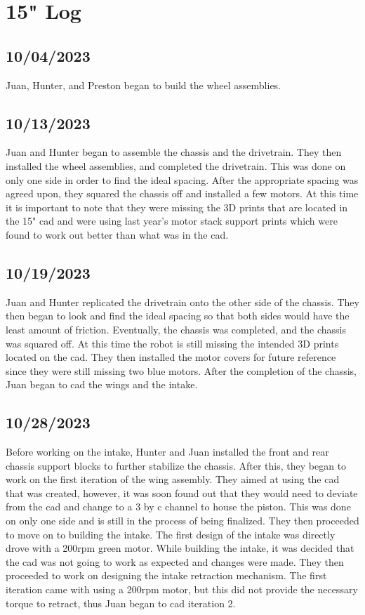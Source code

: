 \section{15" Log}
\subsection{10/04/2023}
Juan, Hunter, and Preston began to build the wheel assemblies.

\subsection{10/13/2023}
Juan and Hunter began to assemble the chassis and the drivetrain. They then installed
the wheel assemblies, and completed the drivetrain. This was done on only one side
in order to find the ideal spacing. After the appropriate spacing was agreed upon,
they squared the chassis off and installed a few motors. At this time it is important to note that they
were missing the 3D prints that are located in the 15" cad and were using last year's motor stack
support prints which were found to work out better than what was in the cad.

\subsection{10/19/2023}
Juan and Hunter replicated the drivetrain onto the other side of the chassis. They then began to
look and find the ideal spacing so that both sides would have the least amount of friction. Eventually,
the chassis was completed, and the chassis was squared off. At this time the robot is still missing the
intended 3D prints located on the cad. They then installed the motor covers for future reference since
they were still missing two blue motors. After the completion of the chassis, Juan began to cad
the wings and the intake.

\subsection{10/28/2023}
Before working on the intake, Hunter and Juan installed the front and rear chassis support blocks
to further stabilize the chassis. After this, they began to work on the first iteration of the wing assembly.
They aimed at using the cad that was created, however, it was soon found out that they would need to deviate
from the cad and change to a 3 by c channel to house the piston. This was done on only one side and is still
in the process of being finalized. They then proceeded to move on to building the intake. The first design
of the intake was directly drove with a 200rpm green motor. While building the intake, it was decided that the
cad was not going to work as expected and changes were made. They then proceeded to work on designing the
intake retraction mechanism. The first iteration came with using a 200rpm motor, but this did not provide
the necessary torque to retract, thus Juan began to cad iteration 2.

